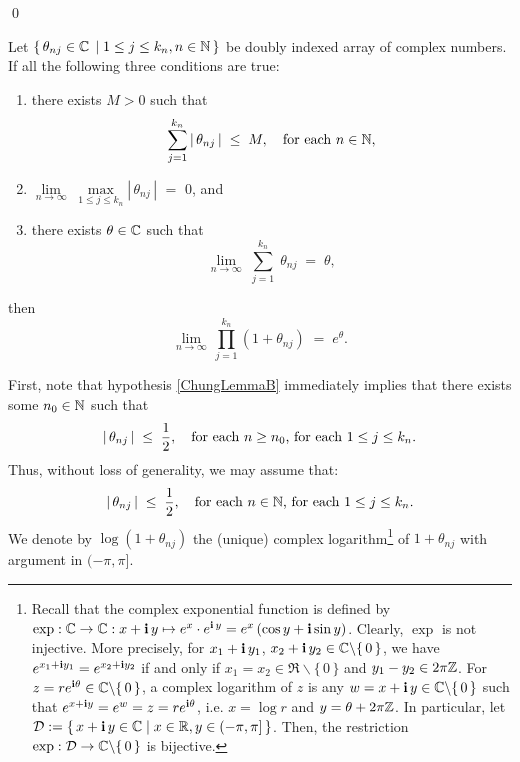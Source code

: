 \qed

\begin{lemma}
\label{ChungSevenOne}
\mbox{}\vskip 0.2cm
\noindent
Let $\{\,\theta_{nj} \in \mathbb{C}\,\;\vert\;1 \leq j \leq k_{n}, n \in \mathbb{N} \,\}$ be doubly indexed array of complex numbers.
If all the following three conditions are true:
\begin{enumerate}
\item	\label{ChungLemmaA}
		there exists $M > 0$ such that
		\begin{equation*}
		\overset{k_{n}}{\underset{j =1}{\sum}}\left\vert\, \theta_{nj} \,\right\vert \;\leq\; M,
		\quad
		\textnormal{for each $n \in \mathbb{N}$},
		\end{equation*}
\item	\label{ChungLemmaB}
		$\underset{n\rightarrow\infty}{\lim} \; \underset{1 \leq j \leq k_{n}}{\max}\left\vert\, \theta_{nj} \,\right\vert$ \;$=$\; $0$, and
\item	\label{ChungLemmaC}
		there exists $\theta \in \mathbb{C}$ such that
		\begin{equation*}
		\lim_{n\rightarrow\infty}\;\overset{k_{n}}{\underset{j =1}{\sum}} \; \theta_{nj} \; = \; \theta,
		\end{equation*}
\end{enumerate}
then
\begin{equation*}
\lim_{n\rightarrow\infty}\,\prod_{j=1}^{k_{n}}\left( 1 + \theta_{nj} \right) \; = \; e^{\theta}.
\end{equation*}
\end{lemma}
\proof
First, note that hypothesis \eqref{ChungLemmaB} immediately implies that there exists some $n_{0} \in \mathbb{N}$ such that
\begin{equation*}
\vert\,\theta_{nj}\,\vert \;\leq\; \dfrac{1}{2},
\quad
\textnormal{for each $n \geq n_{0}$, for each $1 \leq j \leq k_{n}$}.
\end{equation*}
Thus, without loss of generality, we may assume that:
\begin{equation*}
\vert\,\theta_{nj}\,\vert \;\leq\; \dfrac{1}{2},
\quad
\textnormal{for each $n\in\mathbb{N}$, for each $1 \leq j \leq k_{n}$}.
\end{equation*}
We denote by $\log(1+\theta_{nj})$ the (unique) complex logarithm\footnote{Recall that the complex exponential function is defined by
$\exp : \mathbb{C} \rightarrow \mathbb{C} : x + \textnormal{\bf i}\,y \mapsto e^{x}\cdot e^{\textnormal{\bf i}\,y} = e^{x}\left(\cos y + \textnormal{\bf i}\sin y\right)$.
Clearly, $\exp$ is not injective.
More precisely, for $x_{1} + \textnormal{\bf i}\,y_{1}$, $x_{2} + \textnormal{\bf i}\,y_{2} \in \mathbb{C}\backslash\{\,0\,\}$,
we have $e^{x_{1}+\textnormal{\bf i} y_{1}} = e^{x_{2}+\textnormal{\bf i} y_{2}}$ if and only if $x_{1} = x_{2} \in \Re\backslash\{\,0\,\}$ and $y_{1} - y_{2} \in 2\pi\mathbb{Z}$.
For $z = re^{\textnormal{\bf i}\theta} \in \mathbb{C}\backslash\{\,0\,\}$, a complex logarithm
of $z$ is any $w = x + \textnormal{\bf i}\,y \in \mathbb{C}\backslash\{\,0\,\}$ such that $e^{x+\textnormal{\bf i} y} = e^{w} = z = re^{\textnormal{\bf i}\theta}$, i.e.
$x = \log r$ and $y = \theta + 2\pi\mathbb{Z}$. In particular, let $\mathcal{D} := \left\{\,x  +\textnormal{\bf i}\, y \in \mathbb{C} \;\vert\; x \in \mathbb{R}, y \in(-\pi,\pi]\,\right\}$.
Then, the restriction $\exp : \mathcal{D} \rightarrow \mathbb{C}\backslash\{\,0\,\}$ is bijective.} of $1 + \theta_{nj}$ with argument in $(-\pi,\pi]$.

